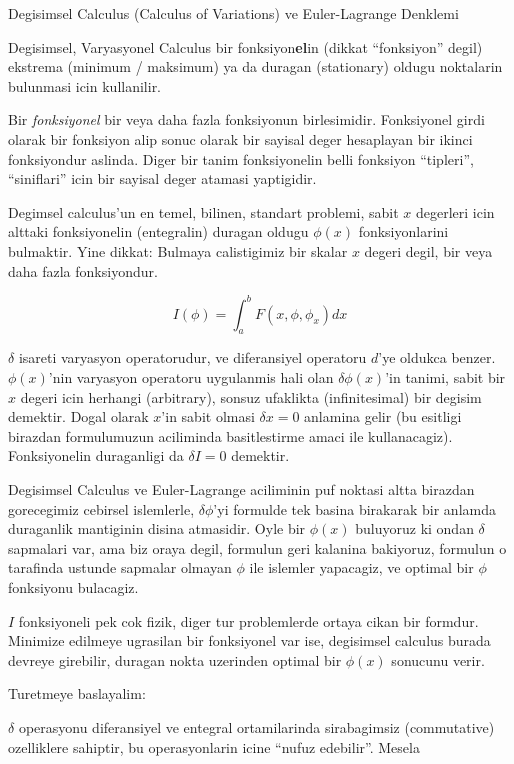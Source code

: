 \documentclass[12pt,fleqn]{article}
\begin{document}
Degisimsel Calculus (Calculus of Variations) ve Euler-Lagrange Denklemi

Degisimsel, Varyasyonel Calculus bir fonksiyon\textbf{el}in (dikkat
``fonksiyon'' degil) ekstrema (minimum / maksimum) ya da duragan
(stationary) oldugu noktalarin bulunmasi icin kullanilir.

Bir {\em fonksiyonel} bir veya daha fazla fonksiyonun
birlesimidir. Fonksiyonel girdi olarak bir fonksiyon alip sonuc olarak
bir sayisal deger hesaplayan bir ikinci fonksiyondur aslinda. Diger
bir tanim fonksiyonelin belli fonksiyon ``tipleri'', ``siniflari''
icin bir sayisal deger atamasi yaptigidir.

Degimsel calculus'un en temel, bilinen, standart problemi, sabit $x$
degerleri icin alttaki fonksiyonelin (entegralin) duragan oldugu
$\phi(x)$ fonksiyonlarini bulmaktir. Yine dikkat: Bulmaya calistigimiz
bir skalar $x$ degeri degil, bir veya daha fazla fonksiyondur.

\[ I(\phi)=\int_a^b F(x,\phi,\phi_x)dx \]

$\delta$ isareti varyasyon operatorudur, ve diferansiyel operatoru
$d$'ye oldukca benzer. $\phi(x)$'nin varyasyon operatoru uygulanmis
hali olan $\delta \phi(x)$'in tanimi, sabit bir $x$ degeri icin
herhangi (arbitrary), sonsuz ufaklikta (infinitesimal) bir degisim
demektir. Dogal olarak $x$'in sabit olmasi $\delta x = 0$ anlamina
gelir (bu esitligi birazdan formulumuzun aciliminda basitlestirme
amaci ile kullanacagiz). Fonksiyonelin duraganligi da $\delta I = 0$
demektir.

Degisimsel Calculus ve Euler-Lagrange aciliminin puf noktasi altta
birazdan gorecegimiz cebirsel islemlerle, $\delta \phi$'yi formulde
tek basina birakarak bir anlamda duraganlik mantiginin disina
atmasidir. Oyle bir $\phi(x)$ buluyoruz ki ondan $\delta$ sapmalari
var, ama biz oraya degil, formulun geri kalanina bakiyoruz, formulun o
tarafinda ustunde sapmalar olmayan $\phi$ ile islemler yapacagiz, ve
optimal bir $\phi$ fonksiyonu bulacagiz.

$I$ fonksiyoneli pek cok fizik, diger tur problemlerde ortaya cikan
bir formdur. Minimize edilmeye ugrasilan bir fonksiyonel var ise,
degisimsel calculus burada devreye girebilir, duragan nokta uzerinden
optimal bir $\phi(x)$ sonucunu verir.

Turetmeye baslayalim:

$\delta$ operasyonu diferansiyel ve entegral ortamilarinda sirabagimsiz
(commutative) ozelliklere sahiptir, bu operasyonlarin icine ``nufuz edebilir''. 
Mesela
\end{document}
